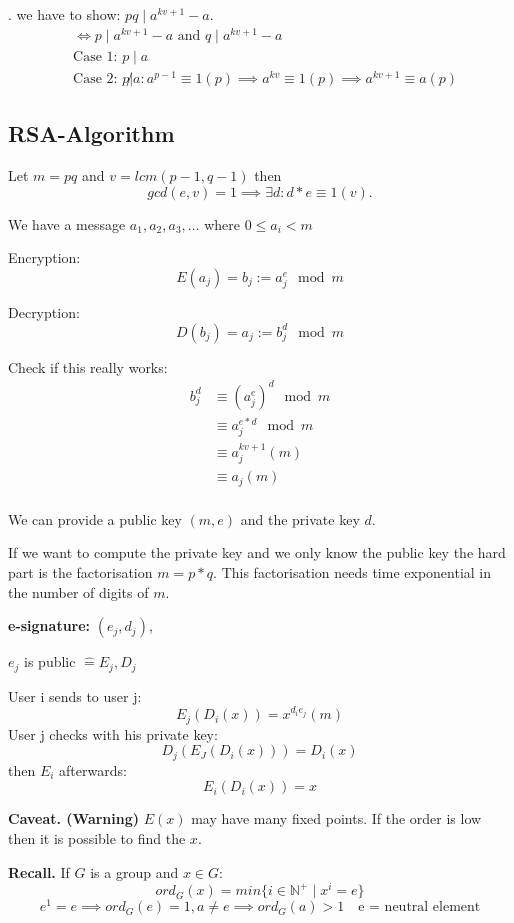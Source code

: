 \Proof.
we have to show: $pq \mid a ^{kv +1} - a$. 
\begin{align*}
  &\Leftrightarrow p \mid a ^{kv +1} - a \text{ and } q \mid a ^{kv +1} - a\\
  &\text{Case 1: } p \mid a \\
  &\text{Case 2: } p\not| a: 
    a^{p-1} \equiv 1 (p) \implies a^{kv} \equiv 1(p) \implies a^{kv+1} \equiv a(p)
\end{align*}

\subsection{RSA-Algorithm}
Let $m = pq$ and $v = lcm(p-1, q-1)$ then 
\[
  gcd(e,v) = 1 \implies \exists d : d *e \equiv 1 (v).
\]

We have a message $a_1, a_2, a_3, \ldots$ where $0 \leq a_i < m$

Encryption: 
\[
  E(a_j) = b_j := a_j^e \mod m
\]

Decryption: 
\[
  D(b_j) = a_j := b_j^d \mod m
\]

Check if this really works:
\begin{align*}
  b_j^d &\equiv (a_j^e)^d \mod m \\
    & \equiv a_j^{e*d} \mod m \\
    & \equiv a_j^{kv+1} (m) \\
    & \equiv a_j (m) \\
\end{align*}

We can provide a public key $(m,e)$ and the private key $d$.

If we want to compute the private key and we only know the public key the hard part is the factorisation $m = p*q$. This factorisation needs time exponential in the number of digits of $m$.

\textbf{e-signature: } 
$(e_j,d_j)$,

$e_j$ is public $\hat{=} E_j, D_j$

User i sends to user j:
\[
  E_j(D_i(x)) = x^{d_i e_j} (m)
\]
User j checks with his private key:
\[
  D_j (E_J(D_i(x))) = D_i(x)
\]
then $E_i$ afterwards:
\[
  E_i(D_i(x)) = x
\]

\textbf{Caveat. (Warning)}
$E(x)$ may have many fixed points. 
If the order is low then it is possible to find the $x$. 

\textbf{Recall.}
If $G$ is a group and $x\in G$:
\[
  ord_G(x) = min\{ i\in \mathbb{N}^{+} \mid x^i = e \}
\]
\[
  e^1 = e \implies ord_G(e) = 1, a \neq e \implies ord_G(a) > 1 \quad \text{e = neutral element}
\]

